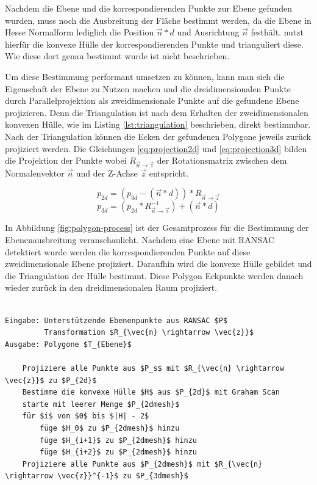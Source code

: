 Nachdem die Ebene und die korrespondierenden Punkte zur Ebene gefunden wurden, muss noch die Ausbreitung der Fläche bestimmt werden, da die Ebene in Hesse Normalform lediglich die Position \(\vec{n} * d\) und Ausrichtung \(\vec{n}\) festhält. \citet{PlanarSurfaceMapping} nutzt hierfür die konvexe Hülle der korrespondierenden Punkte und trianguliert diese. Wie diese dort genau bestimmt wurde ist nicht beschrieben. 

Um diese Bestimmung performant umsetzen zu können, kann man sich die Eigenschaft der Ebene zu Nutzen machen und die dreidimensionalen Punkte durch Parallelprojektion als zweidimensionale Punkte auf die gefundene Ebene projizieren. Denn die Triangulation ist nach dem Erhalten der zweidimensionalen konvexen Hülle, wie im Listing \ref{lst:triangulation} beschrieben, direkt bestimmbar. Nach der Triangulation können die Ecken der gefundenen Polygone jeweils zurück projiziert werden. Die Gleichungen \ref{eq:projection2d} und \ref{eq:projection3d} bilden die Projektion der Punkte wobei \(R_{\vec{n} \rightarrow \vec{z}}\) der Rotationsmatrix zwischen dem Normalenvektor \(\vec{n}\) und der Z-Achse \(\vec{z}\) entspricht.

\begin{equation} \label{eq:projection2d}
p_{2d} = (p_{3d} - (\vec{n}*d)) * R_{\vec{n} \rightarrow \vec{z}}
\end{equation}
\begin{equation} \label{eq:projection3d}
p_{3d} = (p_{2d} * R_{\vec{n} \rightarrow \vec{z}}^{-1}) + (\vec{n}*d)
\end{equation}

In Abbildung \ref{fig:polygon-process} ist der Gesamtprozess für die Bestimmung der Ebenenausbreitung veranschaulicht. Nachdem eine Ebene mit RANSAC detektiert wurde werden die korrespondierenden Punkte auf diese zweidimensionale Ebene projiziert. Daraufhin wird die konvexe Hülle gebildet und die Triangulation der Hülle bestimmt. Diese Polygon Eckpunkte werden danach wieder zurück in den dreidimensionalen Raum projiziert.

\begin{lstlisting}[mathescape,caption=Bestimmung der Ebenenausbreitung und Triangulation, label=lst:triangulation, float=htb]

Eingabe: Unterstützende Ebenenpunkte aus RANSAC $P$
         Transformation $R_{\vec{n} \rightarrow \vec{z}}$
Ausgabe: Polygone $T_{Ebene}$

    Projiziere alle Punkte aus $P_s$ mit $R_{\vec{n} \rightarrow \vec{z}}$ zu $P_{2d}$
    Bestimme die konvexe Hülle $H$ aus $P_{2d}$ mit Graham Scan
    starte mit leerer Menge $P_{2dmesh}$
    für $i$ von $0$ bis $|H| - 2$
        füge $H_0$ zu $P_{2dmesh}$ hinzu
        füge $H_{i+1}$ zu $P_{2dmesh}$ hinzu
        füge $H_{i+2}$ zu $P_{2dmesh}$ hinzu
    Projiziere alle Punkte aus $P_{2dmesh}$ mit $R_{\vec{n} \rightarrow \vec{z}}^{-1}$ zu $P_{3dmesh}$   
\end{lstlisting}

